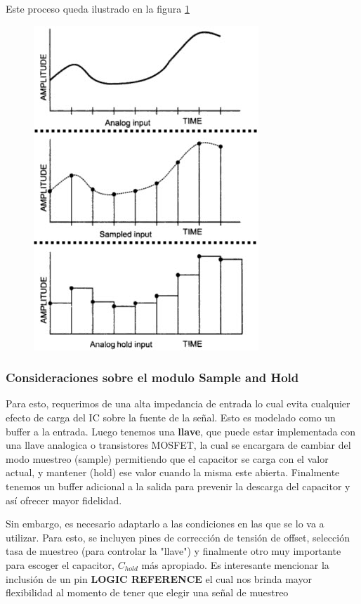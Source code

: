 Este proceso queda ilustrado en la figura \ref{fig:sh-circuit-waveform}
\begin{figure}[H]
	\centering
	\includegraphics[scale=0.5]{ImagenesEjercicio4/SH-Circuit-Waveform}
	\caption{}
	\label{fig:sh-circuit-waveform}
\end{figure}

\subsubsection{Consideraciones sobre el modulo Sample and Hold}
Para esto, requerimos de una alta impedancia de entrada lo cual evita cualquier efecto de carga del IC sobre la fuente de la señal. Esto es modelado como un buffer a la entrada. Luego tenemos una \textbf{llave}, que puede estar implementada con una llave analogica o transistores MOSFET, la cual se encargara de cambiar del modo muestreo (sample) permitiendo que el capacitor se carga con el valor actual, y mantener (hold) ese valor cuando la misma este abierta. Finalmente tenemos un buffer adicional a la salida para prevenir la descarga del capacitor y así ofrecer mayor fidelidad. 


 Sin embargo, es necesario adaptarlo a las condiciones en las que se lo va a utilizar. Para esto, se incluyen pines de corrección de tensión de offset, selección tasa de muestreo (para controlar la "llave") y finalmente otro muy importante para escoger el capacitor, $C_{hold}$ más apropiado.
 Es interesante mencionar la inclusión de un pin \textbf{LOGIC REFERENCE} el cual nos brinda mayor flexibilidad al momento de tener que elegir una señal de muestreo
